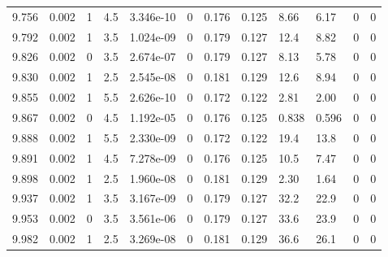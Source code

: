 \documentclass[preview]{standalone}
\begin{document}
{{{{{{{{{\begin{tabular}{L{1.2cm}C{1.2cm} C{0.3cm}C{0.5cm} C{1.4cm}C{1.4cm} C{1.4cm}C{1.4cm} C{1.6cm}C{1.6cm} C{1.6cm}C{1.6cm}}
  9.756  &  0.002  & 1     & 4.5 &  3.346e-10  & 0  &  0.176&   0.125& 8.66 & 6.17   &  0 & 0  \\ 
  9.792  &  0.002  & 1     & 3.5 &  1.024e-09  & 0  &  0.179&   0.127& 12.4 & 8.82   &  0 & 0  \\ 
  9.826  &  0.002  & 0     & 3.5 &  2.674e-07  & 0  &  0.179&   0.127& 8.13 & 5.78   &  0 & 0  \\ 
  9.830  &  0.002  & 1     & 2.5 &  2.545e-08  & 0  &  0.181&   0.129& 12.6 & 8.94   &  0 & 0  \\ 
  9.855  &  0.002  & 1     & 5.5 &  2.626e-10  & 0  &  0.172&   0.122& 2.81 & 2.00   &  0 & 0  \\ 
  9.867  &  0.002  & 0     & 4.5 &  1.192e-05  & 0  &  0.176&   0.125& 0.838 & 0.596   &  0 & 0  \\ 
  9.888  &  0.002  & 1     & 5.5 &  2.330e-09  & 0  &  0.172&   0.122& 19.4 & 13.8   &  0 & 0  \\ 
  9.891  &  0.002  & 1     & 4.5 &  7.278e-09  & 0  &  0.176&   0.125& 10.5 & 7.47   &  0 & 0  \\ 
  9.898  &  0.002  & 1     & 2.5 &  1.960e-08  & 0  &  0.181&   0.129& 2.30 & 1.64   &  0 & 0  \\ 
  9.937  &  0.002  & 1     & 3.5 &  3.167e-09  & 0  &  0.179&   0.127& 32.2 & 22.9   &  0 & 0  \\ 
  9.953  &  0.002  & 0     & 3.5 &  3.561e-06  & 0  &  0.179&   0.127& 33.6 & 23.9   &  0 & 0  \\ 
  9.982  &  0.002  & 1     & 2.5 &  3.269e-08  & 0  &  0.181&   0.129& 36.6 & 26.1   &  0 & 0  \\ 
\hline 
\end{tabular} 

}}}}}}}}}
\end{document}
